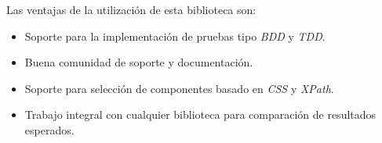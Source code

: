 Las ventajas de la utilización de esta biblioteca son:

\begin{itemize}
    \item Soporte para la implementación de pruebas tipo \emph{BDD} y
        \emph{TDD}.
    \item Buena comunidad de soporte y documentación.
    \item Soporte para selección de componentes basado en \emph{CSS} y
        \emph{XPath}.
    \item Trabajo integral  con cualquier biblioteca para comparación de
        resultados esperados.
\end{itemize}

